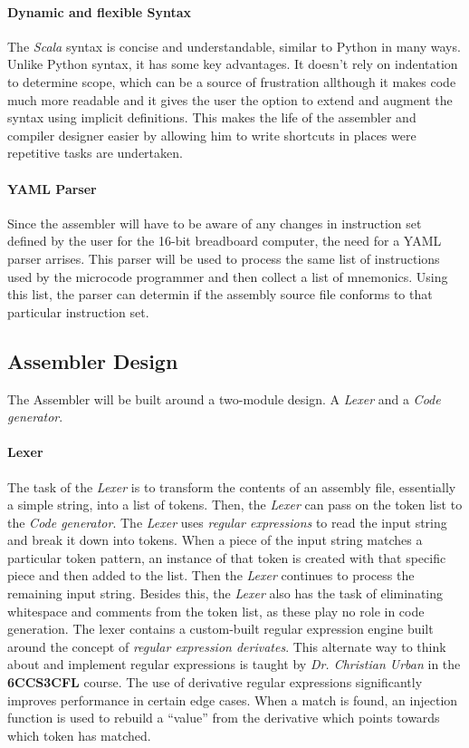 \paragraph{Dynamic and flexible Syntax}
The \emph{Scala} syntax is concise and understandable, similar to Python in many ways. Unlike
Python syntax, it has some key advantages. It doesn't rely on indentation to determine scope,
which can be a source of frustration allthough it makes code much more readable and it gives
the user the option to extend and augment the syntax using implicit definitions. This makes
the life of the assembler and compiler designer easier by allowing him to write shortcuts in
places were repetitive tasks are undertaken.

\paragraph{YAML Parser}
Since the assembler will have to be aware of any changes in instruction set defined by the user
for the 16-bit breadboard computer, the need for a YAML parser arrises. This parser will be used
to process the same list of instructions used by the microcode programmer and then collect a list
of mnemonics. Using this list, the parser can determin if the assembly source file conforms to
that particular instruction set.

\subsection{Assembler Design}
The Assembler will be built around a two-module design. A \emph{Lexer} and a \emph{Code
generator}.

\paragraph{Lexer}
The task of the \emph{Lexer} is to transform the contents of an assembly file, essentially a
simple string, into a list of tokens. Then, the \emph{Lexer} can pass on the token list to the
\emph{Code generator}. The \emph{Lexer} uses \emph{regular expressions} to read the input string
and break it down into tokens. When a piece of the input string matches a particular token
pattern, an instance of that token is created with that specific piece and then added to the
list. Then the \emph{Lexer} continues to process the remaining input string. Besides this, the
\emph{Lexer} also has the task of eliminating whitespace and comments from the token list,
as these play no role in code generation. The lexer contains a custom-built regular expression
engine built around the concept of \emph{regular expression derivates}. This alternate way
to think about and implement regular expressions is taught by \emph{Dr. Christian Urban} in the
\textbf{6CCS3CFL} course\cite{6ccs3cfl}. The use of derivative regular expressions significantly
improves performance in certain edge cases. When a match is found, an injection function is used
to rebuild a ``value'' from the derivative which points towards which token has matched.

